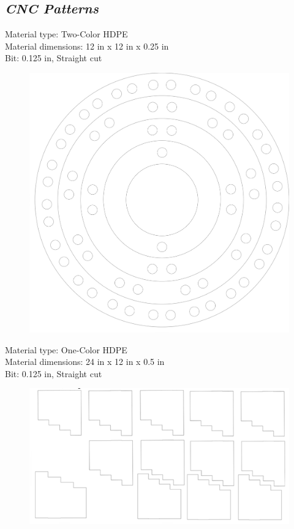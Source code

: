 \documentclass[11pt]{sig-alternate}
\begin{document}
\begin{large}
\section*{\textit{CNC Patterns}}
 Material type: Two-Color HDPE\\
    Material dimensions: 12 in x 12 in x 0.25 in\\
    Bit: 0.125 in, Straight cut
\begin{figure}[htp]
    \centering
    \includegraphics[width=14.5cm]{CNC-Patterns.png}
    \label{Image shows a blueprint for creating the 3D Bohr models.}
\end{figure}
\clearpage
Material type: One-Color HDPE\\
    Material dimensions: 24 in x 12 in x 0.5 in\\
    Bit: 0.125 in, Straight cut
\begin{figure}[htp]
    \centering
    \includegraphics[width=14.5cm]{CNC-Patterns2.png}

\end{figure}
\end{large}
\end{document}
